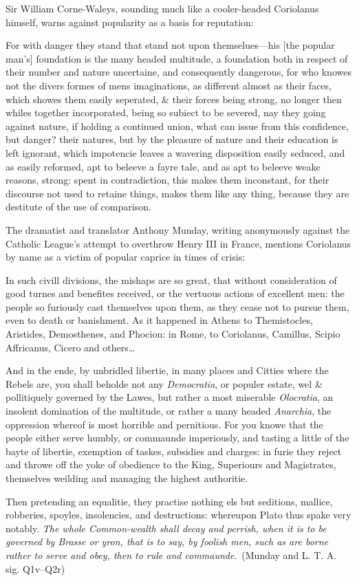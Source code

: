 Sir William Corne-Waleys, sounding much like a cooler-headed Coriolanus himself, warns against popularity as a basis for reputation:
\begin{bq}
For with danger they stand that stand not upon themselues---his [the popular man's] foundation is the many headed multitude, a foundation both in respect of their number and nature uncertaine, and consequently dangerous, for who knowes not the divers formes of mens imaginations, as different almost as their faces, which showes them easily seperated, \& their forces being strong, no longer then whiles together incorporated, being so subiect to be severed, nay they going against nature, if holding a continued union, what can issue from this confidence, but danger? their natures, but by the pleasure of nature and their education is left ignorant, which impotencie leaves a wavering disposition easily seduced, and as easily reformed, apt to beleeve a fayre tale, and as apt to beleeve weake reasons, strong: spent in contradiction, this makes them inconstant, for their discourse not used to retaine things, makes them like any thing, because they are destitute of the use of comparison.~\cite[R5r--R5v]{corne-waleys_essayes_1600}
\end{bq}
The dramatist and translator Anthony Munday, writing anonymously against the Catholic League's attempt to overthrow Henry III in France, mentions Coriolanus by name as a victim of popular caprice in times of crisis:
\begin{bq}
In such civill divisions, the mishaps are so great, that without consideration of good turnes and benefites received, or the vertuous actions of excellent men: the people so furiously cast themselves upon them, as they cease not to pursue them, even to death or banishment.
As it happened in Athens to Themistocles, Aristides, Demosthenes, and Phocion: in Rome, to Coriolanus, Camillus, Scipio Affricanus, Cicero and others…

And in the ende, by unbridled libertie, in many places and Citties where the Rebels are, you shall beholde not any \emph{Democratia}, or populer estate, wel \& pollitiquely governed by the Lawes, but rather a most miserable \emph{Olocratia}, an insolent domination of the multitude, or rather a many headed \emph{Anarchia}, the oppression whereof is most horrible and pernitious.
For you knowe that the people either serve humbly, or commaunde imperiously, and tasting a little of the bayte of libertie, exemption of taskes, subsidies and charges: in furie they reject and throwe off the yoke of obedience to the King, Superiours and Magistrates, themselves weilding and managing the highest authoritie.

Then pretending an equalitie, they practise nothing els but seditions, mallice, robberies, spoyles, insolencies, and destructions: whereupon Plato thus spake very notably.
\emph{The whole Common-wealth shall decay and perrish, when it is to be governed by Brasse or yron, that is to say, by foolish men, such as are borne rather to serve and obey, then to rule and commaunde}.~(Munday and L. T. A. sig. Q1v–Q2r)\nocite{munday_falshood_1605}
\end{bq}
